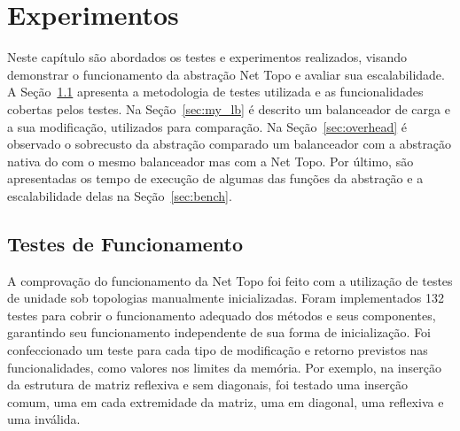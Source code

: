 \chapter{Experimentos}
\label{cap:comprovacao}

Neste capítulo são abordados os testes e experimentos realizados, visando demonstrar o funcionamento da abstração Net Topo e avaliar sua escalabilidade.
A Seção~\ref{sec:testes} apresenta a metodologia de testes utilizada e as funcionalidades cobertas pelos testes.
Na Seção~\ref{sec:my_lb} é descrito um balanceador de carga e a sua modificação, utilizados para comparação.
Na Seção~\ref{sec:overhead} é observado o sobrecusto da abstração comparado um balanceador com a abstração nativa do \charm com o mesmo balanceador mas com a Net Topo.
Por último, são apresentadas os tempo de execução de algumas das funções da abstração e a escalabilidade delas na Seção~\ref{sec:bench}.


\section{Testes de Funcionamento}
\label{sec:testes}


A comprovação do funcionamento da Net Topo foi feito com a utilização de testes de unidade sob topologias manualmente inicializadas.
Foram implementados 132 testes para cobrir o funcionamento adequado dos métodos e seus componentes, garantindo seu funcionamento independente de sua forma de inicialização.
Foi confeccionado um teste para cada tipo de modificação e retorno previstos nas funcionalidades, como valores nos limites da memória.
Por exemplo, na inserção da estrutura de matriz reflexiva e sem diagonais, foi testado uma inserção comum, uma em cada extremidade da matriz, uma em diagonal, uma reflexiva e uma inválida.


